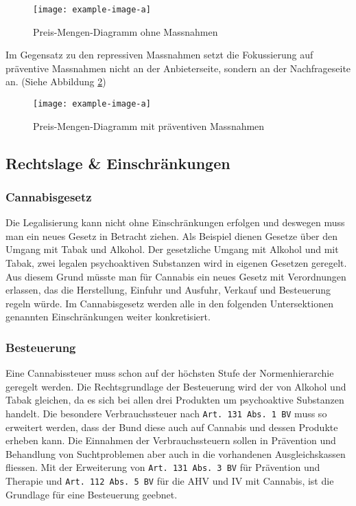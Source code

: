 \documentclass[../main.tex]{subfiles}
\begin{document}
	 \noindent	 
	 \begin{figure}[H]
	 	\centering
		\texttt{[image: example-image-a]}
		\captionsetup{font=small}
		\caption[Preis-Mengen-Diagramm ohne Massnahmen]{Preis-Mengen-Diagramm ohne Massnahmen\protect\footnotemark}		
		\label{fig:equilibrium}
	 \end{figure}
	 
	 
	 Im Gegensatz zu den repressiven Massnahmen setzt die Fokussierung auf präventive Massnahmen nicht an der Anbieterseite, sondern an der Nachfrageseite an.
	 (Siehe Abbildung \ref{fig:prevention})
	 \noindent	 
	 \begin{figure}[H]
	 	\centering
		\texttt{[image: example-image-a]}
		\captionsetup{font=small}
		\caption[Preis-Mengen-Diagramm mit präventiven Massnahmen]{Preis-Mengen-Diagramm mit präventiven Massnahmen\protect\footnotemark}		
		\label{fig:prevention}
	 \end{figure}
	 
	 
	 
	
	 
	 
	 
	 \subsection{Rechtslage \& Einschränkungen}
	 
	 \subsubsection{Cannabisgesetz}
	 Die Legalisierung kann nicht ohne Einschränkungen erfolgen und deswegen muss man ein neues Gesetz in Betracht ziehen.
	 Als Beispiel dienen Gesetze über den Umgang mit Tabak und Alkohol.
	 Der gesetzliche Umgang mit Alkohol und mit Tabak, zwei legalen psychoaktiven Substanzen wird in eigenen Gesetzen geregelt. 
	 Aus diesem Grund müsste man für Cannabis ein neues Gesetz mit Verordnungen erlassen, das die Herstellung, Einfuhr und Ausfuhr, Verkauf und Besteuerung regeln würde.	 
	 Im Cannabisgesetz werden alle in den folgenden Untersektionen genannten Einschränkungen weiter konkretisiert.
	 
	 \subsubsection{Besteuerung}
	 Eine Cannabissteuer muss schon auf der höchsten Stufe der Normenhierarchie geregelt werden. 
	 Die Rechtsgrundlage der Besteuerung wird der von Alkohol und Tabak gleichen, da es sich bei allen drei Produkten um psychoaktive Substanzen handelt.
	 Die besondere Verbrauchssteuer nach \texttt{Art. 131 Abs. 1 BV} muss so erweitert werden, dass der Bund diese auch auf Cannabis und dessen Produkte erheben kann.
	 Die Einnahmen der Verbrauchssteuern sollen in Prävention und Behandlung von Suchtproblemen aber auch in die vorhandenen Ausgleichskassen fliessen.
	 Mit der Erweiterung von \texttt{Art. 131 Abs. 3 BV} für Prävention und Therapie und \texttt{Art. 112 Abs. 5 BV} für die AHV und IV mit Cannabis, ist die Grundlage für eine Besteuerung geebnet.\\
	 
\end{document}
